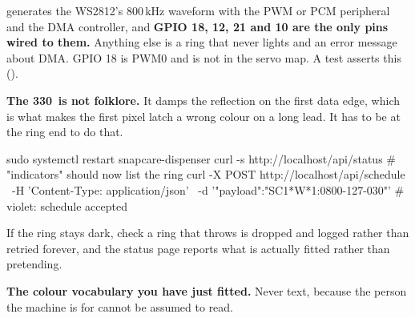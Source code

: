 \documentclass[11pt,a4paper]{article}
\begin{document}
\begin{dangerbox}
 generates the WS2812's 800\,kHz waveform with the PWM or PCM
peripheral and the DMA controller, and \textbf{GPIO 18, 12, 21 and 10 are the
only pins wired to them.} Anything else is a ring that never lights and an error
message about DMA. GPIO 18 is PWM0 and is not in the servo map. A test asserts
this ().
\end{dangerbox}

\noindent\textbf{\sffamily The 330\,\textohm{} is not folklore.} It damps the
reflection on the first data edge, which is what makes the first pixel latch a
wrong colour on a long lead. It has to be at the ring end to do that.

\begin{provebox}
\provetitle
\begin{shell}
sudo systemctl restart snapcare-dispenser
curl -s http://localhost/api/status     # "indicators" should now list the ring
curl -X POST http://localhost/api/schedule \
     -H 'Content-Type: application/json' \
     -d '{"payload":"SC1*W*1:0800-127-030"}'   # violet: schedule accepted
\end{shell}
If the ring stays dark, check \code{journalctl} \textemdash{} a ring that throws
is dropped and logged rather than retried forever, and the status page reports
what is actually fitted rather than pretending.
\end{provebox}

\vspace{2mm}
\noindent\textbf{\sffamily The colour vocabulary you have just fitted.} Never
text, because the person the machine is for cannot be assumed to read.

\vspace{2mm}
\begin{center}
\end{center}
\end{document}
